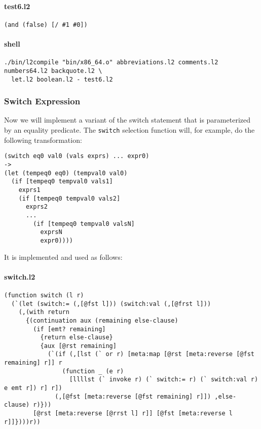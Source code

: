 \documentclass[]{article}
\let\oldparagraph\paragraph
\renewcommand{\paragraph}[1]{\oldparagraph{#1}\mbox{}}
\begin{document}
\paragraph{test6.l2}\label{test6.l2}

\begin{verbatim}
(and (false) [/ #1 #0])
\end{verbatim}

\paragraph{shell}\label{shell-5}

\begin{verbatim}
./bin/l2compile "bin/x86_64.o" abbreviations.l2 comments.l2 numbers64.l2 backquote.l2 \
  let.l2 boolean.l2 - test6.l2
\end{verbatim}

\hypertarget{switch-expression}{\subsubsection{Switch
Expression}\label{switch-expression}}

Now we will implement a variant of the switch statement that is
parameterized by an equality predicate. The \texttt{switch} selection
function will, for example, do the following transformation:

\begin{verbatim}
(switch eq0 val0 (vals exprs) ... expr0)
->
(let (tempeq0 eq0) (tempval0 val0)
  (if [tempeq0 tempval0 vals1]
    exprs1
    (if [tempeq0 tempval0 vals2]
      exprs2
      ...
        (if [tempeq0 tempval0 valsN]
          exprsN
          expr0))))
\end{verbatim}

It is implemented and used as follows:

\paragraph{switch.l2}\label{switch.l2}

\begin{verbatim}
(function switch (l r)
  (`(let (switch:= (,[@fst l])) (switch:val (,[@frst l]))
    (,(with return
      {(continuation aux (remaining else-clause)
        (if [emt? remaining]
          {return else-clause}
          {aux [@rst remaining]
            (`(if (,[lst (` or r) [meta:map [@rst [meta:reverse [@fst remaining] r]] r
                (function _ (e r)
                  [llllst (` invoke r) (` switch:= r) (` switch:val r) e emt r]) r] r])
              (,[@fst [meta:reverse [@fst remaining] r]]) ,else-clause) r)}))
        [@rst [meta:reverse [@rrst l] r]] [@fst [meta:reverse l r]]})))r))
\end{verbatim}
\end{document}
